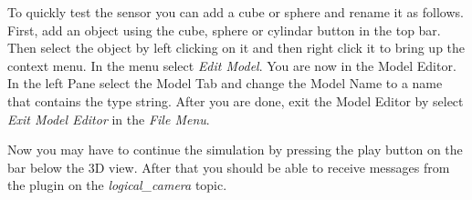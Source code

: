 To quickly test the sensor you can add a cube or sphere and rename it as follows.  First, add an object using the cube, sphere or cylindar button in the top bar. Then select the object by left clicking on it and then right click it to bring up the context menu. In the menu select \textit{Edit Model}. You are now in the Model Editor. In the left Pane select the Model Tab and change the Model Name to a name that contains the type string. After you are done, exit the Model Editor by select \textit{Exit Model Editor} in the \textit{File Menu}.

Now you may have to continue the simulation by pressing the play button on the bar below the 3D view. After that you should be able to receive messages from the plugin on the \textit{logical\_camera} topic.